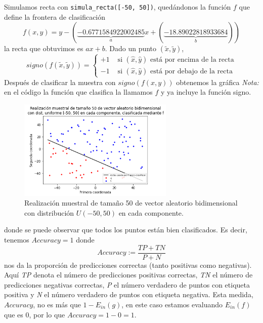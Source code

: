 \documentclass[11pt,a4paper]{article}
\theoremstyle{definition}
\begin{document}
	Simulamos recta con \texttt{simula\_recta([-50, 50])}, quedándonos la función $f$ que define la frontera de clasificación 
	$$f(x,y)=y-(\underbrace{-0.6771584922002485}_a x + (\underbrace{-18.89022818933684}_b))$$%
	la recta que obtuvimos es $ax+b$. Dado un punto $(\tilde x, \tilde y)$,
	$$signo(f(\tilde x,\tilde y))=\begin{cases} +1 & \text{ si } (\hat x,\hat y) \text{ está por encima de la recta}\\ -1 & \text{ si } (\hat x, \hat y) \text{ está por debajo de la recta} \end{cases}$$ 
	Después de clasificar la muestra con $signo(f(x,y))$ obtenemos la gráfica
	\textit{Nota:} en el código la función que clasifica la llamamos $f$ y ya incluye la función signo.
	\begin{figure}[H]
		\centering
		\includegraphics[width=0.66\textwidth]{images/1_2_a}
		\caption{Realización muestral de tamaño 50 de vector aleatorio bidimensional con distribución $U(-50,50)$ en cada componente.}
	\end{figure}
	donde se puede observar que todos los puntos están bien clasificados. Es decir, tenemos $Accuracy=1$ donde
	$$Accuracy:= \frac{TP + TN}{P + N}$$
	nos da la proporción de predicciones correctas (tanto positivas como negativas). Aquí \textit{TP} denota el número de predicciones positivas correctas, \textit{TN} el número de predicciones negativas correctas, \textit{P} el número verdadero de puntos con etiqueta positiva y \textit{N} el número verdadero de puntos con etiqueta negativa. Esta medida, $Accuracy$, no es más que $1-E_{in}(g)$, en este caso estamos evaluando $E_{in}(f)$ que es 0, por lo que $Accuracy=1-0=1$.\\
	
\end{document}
